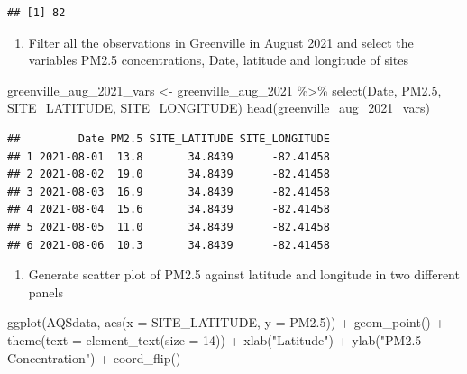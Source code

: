 \documentclass[
]{article}
\newenvironment{Shaded}{\begin{snugshade}}{\end{snugshade}}
\newcommand{\AttributeTok}[1]{\textcolor[rgb]{0.77,0.63,0.00}{#1}}
\newcommand{\DecValTok}[1]{\textcolor[rgb]{0.00,0.00,0.81}{#1}}
\newcommand{\FloatTok}[1]{\textcolor[rgb]{0.00,0.00,0.81}{#1}}
\newcommand{\FunctionTok}[1]{\textcolor[rgb]{0.00,0.00,0.00}{#1}}
\newcommand{\NormalTok}[1]{#1}
\newcommand{\OtherTok}[1]{\textcolor[rgb]{0.56,0.35,0.01}{#1}}
\newcommand{\SpecialCharTok}[1]{\textcolor[rgb]{0.00,0.00,0.00}{#1}}
\newcommand{\StringTok}[1]{\textcolor[rgb]{0.31,0.60,0.02}{#1}}
\providecommand{\tightlist}{%
  \setlength{\itemsep}{0pt}\setlength{\parskip}{0pt}}
\begin{document}
\begin{verbatim}
## [1] 82
\end{verbatim}

\begin{enumerate}
\def\labelenumi{\alph{enumi}.}
\setcounter{enumi}{2}
\tightlist
\item
  Filter all the observations in Greenville in August 2021 and select
  the variables PM2.5 concentrations, Date, latitude and longitude of
  sites
\end{enumerate}

\begin{Shaded}
\begin{Highlighting}[]
\NormalTok{greenville\_aug\_2021\_vars }\OtherTok{\textless{}{-}}\NormalTok{ greenville\_aug\_2021 }\SpecialCharTok{\%\textgreater{}\%}
    \FunctionTok{select}\NormalTok{(Date, PM2}\FloatTok{.5}\NormalTok{, SITE\_LATITUDE, SITE\_LONGITUDE)}
\FunctionTok{head}\NormalTok{(greenville\_aug\_2021\_vars)}
\end{Highlighting}
\end{Shaded}

\begin{verbatim}
##         Date PM2.5 SITE_LATITUDE SITE_LONGITUDE
## 1 2021-08-01  13.8       34.8439      -82.41458
## 2 2021-08-02  19.0       34.8439      -82.41458
## 3 2021-08-03  16.9       34.8439      -82.41458
## 4 2021-08-04  15.6       34.8439      -82.41458
## 5 2021-08-05  11.0       34.8439      -82.41458
## 6 2021-08-06  10.3       34.8439      -82.41458
\end{verbatim}

\begin{enumerate}
\def\labelenumi{\alph{enumi}.}
\setcounter{enumi}{3}
\tightlist
\item
  Generate scatter plot of PM2.5 against latitude and longitude in two
  different panels
\end{enumerate}

\begin{Shaded}
\begin{Highlighting}[]
\FunctionTok{ggplot}\NormalTok{(AQSdata, }\FunctionTok{aes}\NormalTok{(}\AttributeTok{x =}\NormalTok{ SITE\_LATITUDE, }\AttributeTok{y =}\NormalTok{ PM2}\FloatTok{.5}\NormalTok{)) }\SpecialCharTok{+} \FunctionTok{geom\_point}\NormalTok{() }\SpecialCharTok{+}
    \FunctionTok{theme}\NormalTok{(}\AttributeTok{text =} \FunctionTok{element\_text}\NormalTok{(}\AttributeTok{size =} \DecValTok{14}\NormalTok{)) }\SpecialCharTok{+} \FunctionTok{xlab}\NormalTok{(}\StringTok{"Latitude"}\NormalTok{) }\SpecialCharTok{+}
    \FunctionTok{ylab}\NormalTok{(}\StringTok{"PM2.5 Concentration"}\NormalTok{) }\SpecialCharTok{+} \FunctionTok{coord\_flip}\NormalTok{()}
\end{Highlighting}
\end{Shaded}
\end{document}
